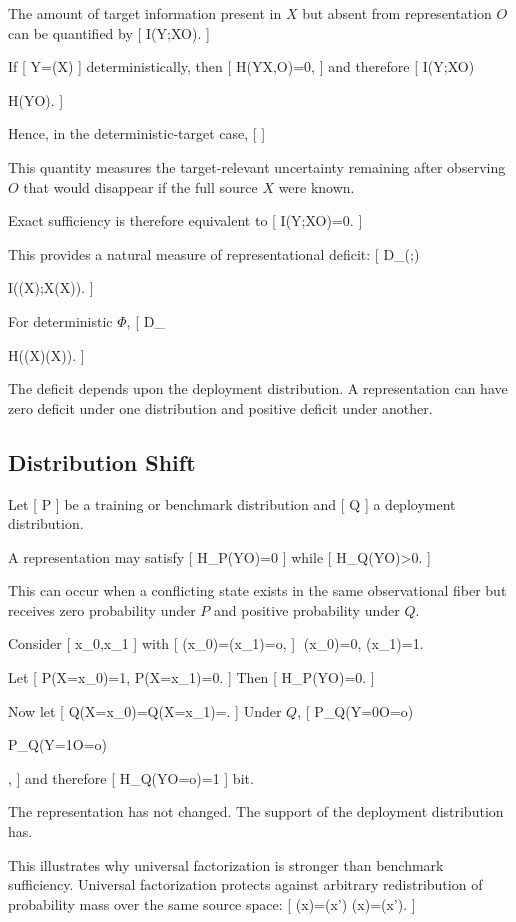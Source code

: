 \documentclass[11pt]{article}
\begin{document}
The amount of target information present in $X$ but absent from representation $O$ can be quantified by
[
I(Y;X\mid O).
]

If
[
Y=\Phi(X)
]
deterministically, then
[
H(Y\mid X,O)=0,
]
and therefore
[
I(Y;X\mid O)

H(Y\mid O).
]

Hence, in the deterministic-target case,
[
]

This quantity measures the target-relevant uncertainty remaining after observing $O$ that would disappear if the full source $X$ were known.

Exact sufficiency is therefore equivalent to
[
I(Y;X\mid O)=0.
]

This provides a natural measure of representational deficit:
[
D_{}(\pi;\Phi)

I(\Phi(X);X\mid\pi(X)).
]

For deterministic $\Phi$,
[
D_{}

H(\Phi(X)\mid\pi(X)).
]

The deficit depends upon the deployment distribution. A representation can have zero deficit under one distribution and positive deficit under another.

\subsection{Distribution Shift}

Let
[
P
]
be a training or benchmark distribution and
[
Q
]
a deployment distribution.

A representation may satisfy
[
H_P(Y\mid O)=0
]
while
[
H_Q(Y\mid O)>0.
]

This can occur when a conflicting state exists in the same observational fiber but receives zero probability under $P$ and positive probability under $Q$.

Consider
[
x_0,x_1
]
with
[
\pi(x_0)=\pi(x_1)=o,
]
\Phi(x_0)=0,
\qquad
\Phi(x_1)=1.


Let
[
P(X=x_0)=1,
\qquad
P(X=x_1)=0.
]
Then
[
H_P(Y\mid O)=0.
]

Now let
[
Q(X=x_0)=Q(X=x_1)=.
]
Under $Q$,
[
P_Q(Y=0\mid O=o)

P_Q(Y=1\mid O=o)

,
]
and therefore
[
H_Q(Y\mid O=o)=1
]
bit.

The representation has not changed. The support of the deployment distribution has.

This illustrates why universal factorization is stronger than benchmark sufficiency. Universal factorization protects against arbitrary redistribution of probability mass over the same source space:
[
\pi(x)=\pi(x')
\Longrightarrow
\Phi(x)=\Phi(x').
]
\end{document}
